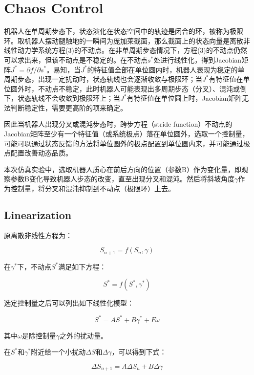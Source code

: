 \documentclass[UTF8]{ctexart}
\begin{document}
\section{Chaos Control}
机器人在单周期步态下，状态演化在状态空间中的轨迹是闭合的环，被称为极限环。取机器人摆动腿触地的一瞬间为庞加莱截面，那么截面上的状态向量是离散非线性动力学系统方程(3)的不动点。在非单周期步态情况下，方程(3)的不动点仍然可以求出来，但该不动点是不稳定的。在不动点$s^{*}$处进行线性化，得到Jacobian矩阵$J^{*}=\partial f/\partial s^{*}$。易知，当$J^{*}$的特征值全部在单位圆内时，机器人表现为稳定的单周期步态，出现一定扰动时，状态轨线也会逐渐收敛与极限环；当$J^{*}$有特征值在单位圆外时，不动点不稳定，此时机器人可能表现出多周期步态（分叉）、混沌或倒下，状态轨线不会收敛到极限环上；当$J^{*}$有特征值在单位圆上时，Jacobian矩阵无法判断稳定性，需要更高阶的项来确定。\par
因此当机器人出现分叉或混沌步态时，跨步方程（stride function）不动点的Jacobian矩阵至少有一个特征值（或系统极点）落在单位圆外，选取一个控制量，可能可以通过状态反馈的方法将单位圆外的极点配置到单位圆内来，并可能通过极点配置改善动态品质。\par
本次仿真实验中，选取机器人质心在前后方向的位置（参数B）作为变化量，即观察参数B变化导致机器人步态的改变，直至出现分叉和混沌。然后将斜坡角度$\gamma$作为控制量，将分叉和混沌抑制到不动点（极限环）上去。\par
\subsection{Linearization}
原离散非线性方程为：\par
\begin{equation}
S_{n+1}=f(S_{n},\gamma)
\end{equation}
\par
在$\gamma^{*}$下，不动点$S^{*}$满足如下方程：\par
\begin{equation}
S^{*}=f(S^{*},\gamma^{*})
\end{equation}
\par
选定控制量之后可以列出如下线性化模型：\par
\begin{equation}
S^{*}=AS^{*}+B\gamma^{*}+F\omega
\end{equation}
\par
其中$\omega$是除控制量$\gamma$之外的扰动量。\par
在$S^{*}$和$\gamma^{*}$附近给一个小扰动$\Delta S$和$\Delta\gamma$，可以得到下式：\par
\begin{equation}
\Delta S_{n+1}=A\Delta S_{n}+B\Delta\gamma
\end{equation}
\par
\end{document}

